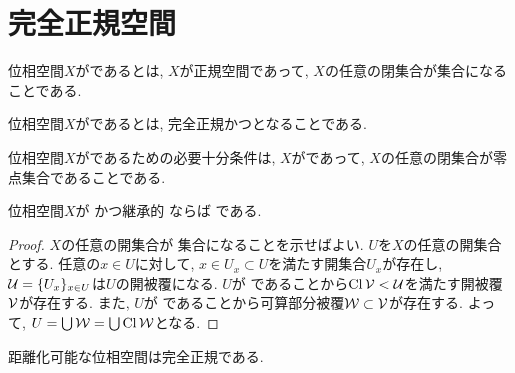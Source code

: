 \documentclass[uplatex, dvipdfmx, a4paper, 12pt, class=jsbook, crop=false]{standalone}
\begin{document}
\section{完全正規空間}
\label{sec:perfectly-normal-spaces}

\begin{definition}
	位相空間$ X $がであるとは,
	$ X $が正規空間であって,
	$ X $の任意の閉集合が\Gdelta 集合になることである.
\end{definition}

\begin{definition}
	位相空間$ X $がであるとは,
	完全正規かつとなることである.
\end{definition}

\begin{proposition}
	位相空間\(X\)がであるための必要十分条件は,
	\(X\)がであって,
	\(X\)の任意の閉集合が零点集合であることである.
\end{proposition}

\begin{proposition}
	\label{prop:T_3 + hLind. implies T_6}
	位相空間$X$が かつ継承的 \Lindelof ならば である.
\end{proposition}
\begin{proof}
	$X$の任意の開集合が \Fsigma 集合になることを示せばよい.
	$U$を$X$の任意の開集合とする.
	任意の$x\in U$に対して, $x\in U_x\subset U$を満たす開集合$U_x$が存在し,
	${\cal U}=\{U_x\}_{x\in U}$は$U$の開被覆になる.
	$U$が  であることから$\mathop{\mathrm{Cl}}\nolimits {\cal V}< {\cal U}$を満たす開被覆${\cal V}$が存在する.
	また,
	$U$が \Lindelof であることから可算部分被覆${\cal W}\subset {\cal V}$が存在する.
	よって, $U=\bigcup {\cal W}=\bigcup \mathop{\mathrm{Cl}}\nolimits {\cal W}$となる.
\end{proof}

\begin{proposition}
	距離化可能な位相空間は完全正規である.
\end{proposition}
\end{document}
